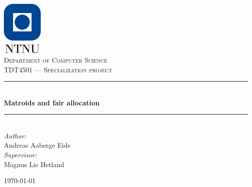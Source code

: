 \documentclass[b5paper]{report}
\begin{document}
\begin{titlepage}
  \newcommand{\HRule}{\rule{\linewidth}{0.5mm}}

  \vbox{ }
  \vbox{ }
  \begin{center}
    \includegraphics[width=0.15\textwidth]{ntnu.png}\\[1cm]
    \textsc{\Large Department of Computer Science}\\[1.5cm]
    \textsc{\large TDT4501 --- Specialization project}\\[0.5cm]
    \vbox{ }

    \HRule \\[0.4cm]
    { \huge \bfseries Matroids and fair allocation}\\[0.4cm]
    \HRule \\[1.5cm]

    \large
    \emph{Author:}\\
    Andreas Aaberge Eide\\[0.5cm]
    \emph{Supervisor:}\\
    Magnus Lie Hetland
    \vfill

    {\large \today\par}
  \end{center}
\end{titlepage}






\printskelnotes{}


\end{document}
